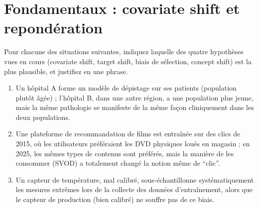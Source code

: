 \documentclass[11pt]{article}
\begin{document}
\pagestyle{fancy}

\section{Fondamentaux : covariate shift et repondération}

\begin{exercise}
Pour chacune des situations suivantes, indiquez laquelle des quatre hypothèses vues en cours
(covariate shift, target shift, biais de sélection, concept shift) est la plus plausible, et
justifiez en une phrase.
\begin{enumerate}[label=(\alph*)]
\item Un hôpital A forme un modèle de dépistage sur ses patients (population plutôt âgée) ; l'hôpital B,
dans une autre région, a une population plus jeune, mais la même pathologie se manifeste de la même façon
cliniquement dans les deux populations.
\item Une plateforme de recommandation de films est entraînée sur des clics de 2015, où les
utilisateurs préféraient les DVD physiques loués en magasin ; en 2025, les mêmes types de contenus sont
préférés, mais la manière de les consommer (SVOD) a totalement changé la notion même de \enquote{clic}.
\item Un capteur de température, mal calibré, sous-échantillonne systématiquement les mesures extrêmes
lors de la collecte des données d'entraînement, alors que le capteur de production (bien calibré) ne
souffre pas de ce biais.
\end{enumerate}
\end{exercise}
\end{document}
